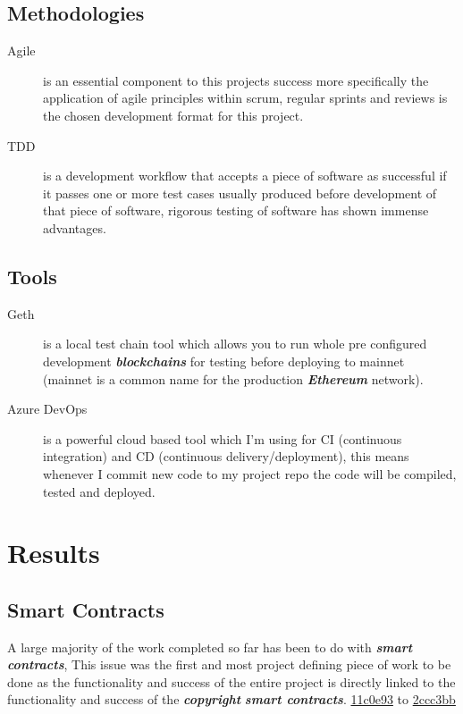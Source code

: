 \documentclass[12pt]{article}
\newcommand{\keyword}[1]{\textbf{\textit{#1}}}
\begin{document}
\subsection{Methodologies}

\begin{description}
	\item[Agile] is an essential component to this projects success more specifically the application of agile principles within scrum, regular sprints and reviews is the chosen development format for this project.
	\item[TDD] is a development workflow that accepts a piece of software as successful if it passes one or more test cases usually produced before development of that piece of software, rigorous testing of software has shown immense advantages.
\end{description}

\subsection{Tools}

\begin{description}
	\item[Geth] is a local test chain tool which allows you to run whole pre configured development \keyword{blockchains} for testing before deploying to mainnet (mainnet is a common name for the production \keyword{Ethereum} network).
	\item[Azure DevOps] is a powerful cloud based tool which I'm using for CI (continuous integration) and CD (continuous delivery/deployment), this means whenever I commit new code to my project repo the code will be compiled, tested and deployed.
\end{description}

\section{Results}

\subsection{Smart Contracts}

A large majority of the work completed so far has been to do with \keyword{smart contracts}, This issue was the first and most project defining piece of work to be done as the functionality and success of the entire project is directly linked to the functionality and success of the \keyword{copyright} \keyword{smart contracts}. \href{https://github.com/MrHarrisonBarker/CRPL/commit/11c0e93bc92ad849c3cbea70db5ca637a320e5b2}{11c0e93} to \href{https://github.com/MrHarrisonBarker/CRPL/commit/2ccc3bbea3a7939e7f2012626ed91e4850a74d6f}{2ccc3bb}
\end{document}
